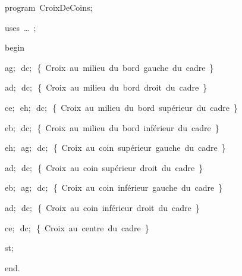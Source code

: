 
{
\parindent {}
\medskip

\carrenoir
\vspace{\neglskip}\mbox{\blc  \idt  \mcl program\idt \ CroixDeCoins$;$
}\par 
\vspace{\neglskip}\mbox{\blc \blk\idt \mcl uses\idt \ \ldots\ $;$
}\par 
\vspace{\neglskip}\mbox{\blc  \idt  \mcl begin\idt \ }\par 
\vspace{\neglskip}\mbox{\blc  \blk\idt  ag$;$\ dc$;$\ \cmt  \{\ Croix\ au\ milieu\ du\ bord\ gauche\ du\ cadre\ \}\idt }\par 
\vspace{\neglskip}\mbox{\blc  \blk\idt  ad$;$\ dc$;$\ \cmt  \{\ Croix\ au\ milieu\ du\ bord\ droit\ du\ cadre\ \}\idt }\par 
\vspace{\neglskip}\mbox{\blc  \blk\idt  ce$;$\ eh$;$\ dc$;$\ \cmt  \{\ Croix\ au\ milieu\ du\ bord\ supérieur\ du\ cadre\ \}\idt }\par 
\vspace{\neglskip}\mbox{\blc  \blk\idt  eb$;$\ dc$;$\ \cmt  \{\ Croix\ au\ milieu\ du\ bord\ inférieur\ du\ cadre\ \}\idt }\par 
\vspace{\neglskip}\mbox{\blc  \blk\idt  eh$;$\ ag$;$\ dc$;$\ \cmt  \{\ Croix\ au\ coin\ supérieur\ gauche\ du\ cadre\ \}\idt }\par 
\vspace{\neglskip}\mbox{\blc  \blk\idt  ad$;$\ dc$;$\ \cmt  \{\ Croix\ au\ coin\ supérieur\ droit\ du\ cadre\ \}\idt }\par 
\vspace{\neglskip}\mbox{\blc  \blk\idt  eb$;$\ ag$;$\ dc$;$\ \cmt  \{\ Croix\ au\ coin\ inférieur\ gauche\ du\ cadre\ \}\idt }\par 
\vspace{\neglskip}\mbox{\blc  \blk\idt  ad$;$\ dc$;$\ \cmt  \{\ Croix\ au\ coin\ inférieur\ droit\ du\ cadre\ \}\idt }\par 
\vspace{\neglskip}\mbox{\blc  \blk\idt  ce$;$\ dc$;$\ \cmt  \{\ Croix\ au\ centre\ du\ cadre\ \}\idt }\par 
\vspace{\neglskip}\mbox{\blc  \blk\idt  st$;$}\par 
\vspace{\neglskip}\mbox{\blc  \idt  \mcl end\idt $.$}\par 

\medskip }

